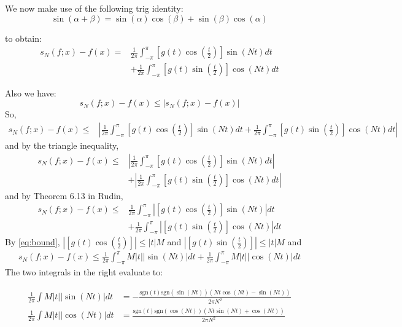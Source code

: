 \documentclass{article}
\begin{document}
We now make use of the following trig identity:
\begin{equation}
\sin(\alpha+\beta)=\sin(\alpha)\cos(\beta)+\sin(\beta)\cos(\alpha)
\end{equation}

to obtain:
\begin{align}
\nonumber
s_{N}(f;x) -f(x) =& \frac{1}{2\pi} \int_{-\pi}^{\pi}\left[g(t)\cos(\frac{t}{2})\right]\sin(Nt)dt
\label{eq:ineq}
\\&+\frac{1}{2\pi}\int_{-\pi}^{\pi}\left[g(t)\sin(\frac{t}{2})\right]\cos(Nt)dt
\end{align}

Also we have:
\begin{equation}
s_{N}(f;x) -f(x) \leq |s_{N}(f;x) -f(x)|
\end{equation}
So,
\begin{align}
s_{N}(f;x) -f(x)\leq &\left|\frac{1}{2\pi} \int_{-\pi}^{\pi}\left[g(t)\cos(\frac{t}{2})\right]\sin(Nt)dt+\frac{1}{2\pi}\int_{-\pi}^{\pi}\left[g(t)\sin(\frac{t}{2})\right]\cos(Nt)dt\right|
\end{align}
and by the triangle inequality,
\begin{align}
s_{N}(f;x) -f(x) \leq&\left|\frac{1}{2\pi} \int_{-\pi}^{\pi}\left[g(t)\cos(\frac{t}{2})\right]\sin(Nt)dt\right|\\
&+ \left|\frac{1}{2\pi}\int_{-\pi}^{\pi}\left[g(t)\sin(\frac{t}{2})\right]\cos(Nt)dt\right|
\end{align}
and by Theorem 6.13 in Rudin,
\begin{align}
s_{N}(f;x) -f(x) \leq&\frac{1}{2\pi} \int_{-\pi}^{\pi}\left|\left[g(t)\cos(\frac{t}{2})\right]\sin(Nt)\right|dt\\
&+ \frac{1}{2\pi}\int_{-\pi}^{\pi}\left|\left[g(t)\sin(\frac{t}{2})\right]\cos(Nt)\right|dt
\end{align}
By \ref{eq:bound}, $\left|\left[g(t)\cos(\frac{t}{2})\right]\right| \leq |t|M$ and $\left|\left[g(t)\sin(\frac{t}{2})\right]\right| \leq |t|M$  
 and 
\begin{align}
s_{N}(f;x) -f(x) \leq \frac{1}{2\pi} \int_{-\pi}^{\pi} M|t|\left|\sin(Nt)\right| dt  +\frac{1}{2\pi} \int_{-\pi}^{\pi} M|t|\left|\cos(Nt)\right| dt  
\end{align}
The two integrals in the right evaluate to:

\begin{align}
 \frac{1}{2\pi} \int M|t|\left|\sin(Nt)\right| dt &=-\frac{\text{sgn}(t)\text{sgn}(\sin(Nt))(Nt\cos(Nt)-\sin(Nt))}{2\pi N^2}\\
 \frac{1}{2\pi} \int M|t|\left|\cos(Nt)\right| dt  &=\frac{\text{sgn}(t)\text{sgn}(\cos(Nt))(Nt\sin(Nt)+\cos(Nt))}{2\pi N^2}
\end{align}
\end{document}

